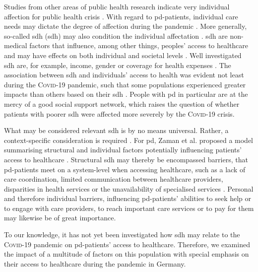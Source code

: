 \documentclass{bmcart}
\begin{document}
Studies from other areas of public health research indicate very individual affection for public health crisis \cite{huijts2017prevalence, lowcock2012social}. With regard to \ac{pd}-patients, individual care needs may dictate the degree of affection during the pandemic \cite{frundt2022impact}. More generally, so-called \acl{sdh} (\acs{sdh}) may also condition the individual affectation \cite{brown2020effect}. \ac{sdh} are non-medical factors that influence, among other things, peoples' access to healthcare and may have effects on both individual and societal levels \cite{world2010conceptual}. Well investigated \ac{sdh} are, for example, income, gender or coverage for health expenses \cite{marmot2005social, paremoer2021covid}. The association between \ac{sdh} and individuals' access to health was evident not least during the \textsc{Covid}-19 pandemic, such that some populations experienced greater impacts than others based on their \ac{sdh} \cite{whocovidbrief}. People with \ac{pd} in particular are at the mercy of a good social support network, which raises the question of whether patients with poorer \ac{sdh} were affected more severely by the \textsc{Covid}-19 crisis.

What may be considered relevant \ac{sdh} is by no means universal. Rather, a context-specific consideration is required \cite{world2010conceptual}. For \ac{pd}, Zaman et al. proposed a model summarising structural and individual factors potentially influencing patients' access to healthcare \cite{zaman2021barriers}. Structural \ac{sdh} may thereby be encompassed barriers, that \ac{pd}-patients meet on a system-level when accessing healthcare, such as a lack of care coordination, limited communication between healthcare providers, disparities in health services or the unavailability of specialised services \cite{zaman2021barriers}. Personal and therefore individual barriers, influencing \ac{pd}-patients' abilities to seek help or to engage with care providers, to reach important care services or to pay for them \cite{zaman2021barriers} may likewise be of great importance.

To our knowledge, it has not yet been investigated how \ac{sdh} may relate to the \textsc{Covid}-19 pandemic on \ac{pd}-patients' access to healthcare. Therefore, we examined the impact of a multitude of factors on this population with special emphasis on their access to healthcare during the pandemic in Germany. 

\newpage
\end{document}
